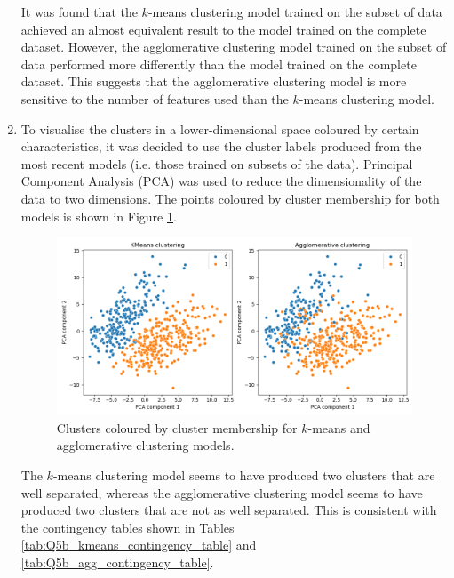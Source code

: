 \documentclass{article}
\begin{document}
\begin{enumerate}[label=\alph*)]
    It was found that the $k$-means clustering model trained on the subset of data achieved an almost equivalent result to the model trained on the complete dataset. However, the agglomerative clustering model trained on the subset of data performed more differently than the model trained on the complete dataset. This suggests that the agglomerative clustering model is more sensitive to the number of features used than the $k$-means clustering model.

    \item To visualise the clusters in a lower-dimensional space coloured by certain characteristics, it was decided to use the cluster labels produced from the most recent models (i.e. those trained on subsets of the data). Principal Component Analysis (PCA) was used to reduce the dimensionality of the data to two dimensions. The points coloured by cluster membership for both models is shown in Figure \ref{fig:Q5c_clusters}.
    \begin{figure}[!htb]
        \centering
        \includegraphics[width=\textwidth]{Q5c_KMeans_Agglomerative_PCA.png}
        \caption{Clusters coloured by cluster membership for $k$-means and agglomerative clustering models.}
        \label{fig:Q5c_clusters}
    \end{figure}
    The $k$-means clustering model seems to have produced two clusters that are well separated, whereas the agglomerative clustering model seems to have produced two clusters that are not as well separated. This is consistent with the contingency tables shown in Tables \ref{tab:Q5b_kmeans_contingency_table} and \ref{tab:Q5b_agg_contingency_table}.


\end{enumerate}
\end{document}
